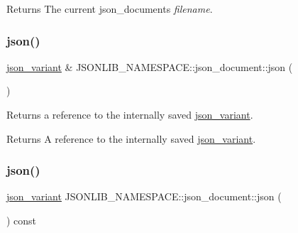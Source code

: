 \begin{DoxyReturn}{Returns}
The current json\+\_\+documents {\itshape filename}. 
\end{DoxyReturn}
\mbox{\label{classJSONLIB__NAMESPACE_1_1json__document_ad87b8e7d68ba854dbd730758273a3b93}} 
\subsubsection{\texorpdfstring{json()}{json()}\hspace{0.1cm}{\footnotesize\ttfamily [1/2]}}
{\footnotesize\ttfamily \hyperlink{classJSONLIB__NAMESPACE_1_1json__variant}{json\+\_\+variant} \& J\+S\+O\+N\+L\+I\+B\+\_\+\+N\+A\+M\+E\+S\+P\+A\+C\+E\+::json\+\_\+document\+::json (\begin{DoxyParamCaption}{ }\end{DoxyParamCaption})}



Returns a reference to the internally saved \hyperlink{classJSONLIB__NAMESPACE_1_1json__variant}{json\+\_\+variant}. 

\begin{DoxyReturn}{Returns}
A reference to the internally saved \hyperlink{classJSONLIB__NAMESPACE_1_1json__variant}{json\+\_\+variant}. 
\end{DoxyReturn}
\mbox{\label{classJSONLIB__NAMESPACE_1_1json__document_afc25f82f6d2729be0ae1bcc82b8968e3}} 
\subsubsection{\texorpdfstring{json()}{json()}\hspace{0.1cm}{\footnotesize\ttfamily [2/2]}}
{\footnotesize\ttfamily \hyperlink{classJSONLIB__NAMESPACE_1_1json__variant}{json\+\_\+variant} J\+S\+O\+N\+L\+I\+B\+\_\+\+N\+A\+M\+E\+S\+P\+A\+C\+E\+::json\+\_\+document\+::json (\begin{DoxyParamCaption}{ }\end{DoxyParamCaption}) const}



